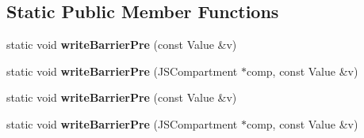 \subsection*{Static Public Member Functions}
\begin{DoxyCompactItemize}
\item 
\hypertarget{classjs_1_1_encapsulated_value_a64abf636440ba5fba0907f60d96386db}{static void {\bfseries write\-Barrier\-Pre} (const Value \&v)}\label{classjs_1_1_encapsulated_value_a64abf636440ba5fba0907f60d96386db}

\item 
\hypertarget{classjs_1_1_encapsulated_value_aabb1417fd5ca9aa1a743c24b17fb052c}{static void {\bfseries write\-Barrier\-Pre} (J\-S\-Compartment $\ast$comp, const Value \&v)}\label{classjs_1_1_encapsulated_value_aabb1417fd5ca9aa1a743c24b17fb052c}

\item 
\hypertarget{classjs_1_1_encapsulated_value_a64abf636440ba5fba0907f60d96386db}{static void {\bfseries write\-Barrier\-Pre} (const Value \&v)}\label{classjs_1_1_encapsulated_value_a64abf636440ba5fba0907f60d96386db}

\item 
\hypertarget{classjs_1_1_encapsulated_value_aabb1417fd5ca9aa1a743c24b17fb052c}{static void {\bfseries write\-Barrier\-Pre} (J\-S\-Compartment $\ast$comp, const Value \&v)}\label{classjs_1_1_encapsulated_value_aabb1417fd5ca9aa1a743c24b17fb052c}

\end{DoxyCompactItemize}
